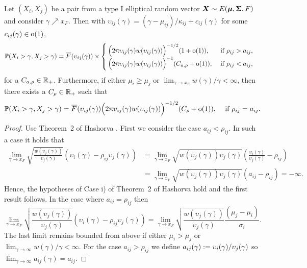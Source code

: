 \begin{subappendices}
\begin{theorem} \label{thm:type_1_asymptotics}
 Let $(X_i, X_j)$ be a pair from a type I elliptical random vector $\bm{X} \sim E(\bm{\mu}, \bm{\Sigma}, F)$
 and consider $\gamma \nearrow x_F$.
Then with $\upsilon_{ij}(\gamma)=(\gamma-\mu_{ij})/\kappa_{ij}+c_{ij}(\gamma)$ for some $c_{ij}(\gamma) \in {\mathrm{o}}(1)$,
 \begin{align*}
   \Prob(X_i > \gamma, X_j > \gamma)
   &= \Ftail(\upsilon_{ij}(\gamma)) \times \begin{cases}
   		 \Bigl( 2\pi \upsilon_{ij}(\gamma) w(\upsilon_{ij}(\gamma)) \Bigr)^{-1/2}(1 + \oh(1)),
   		 & \text{ if } \rho_{ij} > a_{ij}, \\
         \Bigl( 2\pi \upsilon_{ij}(\gamma) w(\upsilon_{ij}(\gamma)) \Bigr)^{-1}(C_{a,\rho} + \oh(1)),
         & \text{ if } \rho_{ij} < a_{ij},
   	\end{cases}
 \end{align*}
 for a $C_{a,\rho} \in \mathbb{R}_+$.
Furthermore, if either $\mu_i\ge\mu_j$ or $\lim_{\gamma\to x_F}w(\gamma)/\gamma<\infty$, then there exists a $C_\rho \in \mathbb{R}_+$ such that
 \begin{align*}
   \Prob(X_i > \gamma, X_j > \gamma)
   &= \Ftail(\upsilon_{ij}(\gamma)) \Bigl( 2\pi \upsilon_{ij}(\gamma) w(\upsilon_{ij}(\gamma)) \Bigr)^{-1/2}(C_\rho + \oh(1)),
   		 & \text{ if } \rho_{ij} = a_{ij}.
 \end{align*}
\end{theorem}

\begin{proof}

Use Theorem~2 of Hashorva \cite{hashorva2007asymptotic}.
First we consider the case $a_{ij}<\rho_{ij}$.  In such a case it holds that
\begin{align*}
 \lim_{\gamma\to x_F} \sqrt{\frac{w(\upsilon_j(\gamma))}{\upsilon_j(\gamma)}}\left(\upsilon_i(\gamma)-\rho_{ij}\upsilon_j(\gamma)\right)
 &=\lim_{\gamma\to x_F} \sqrt{{w(\upsilon_j(\gamma))\upsilon_j(\gamma)}}\left(\frac{\upsilon_i(\gamma)}{\upsilon_j(\gamma)}-\rho_{ij}\right)\\
 &=\lim_{\gamma\to x_F} \sqrt{{w(\upsilon_j(\gamma))\upsilon_j(\gamma)}}\left(a_{ij}-\rho_{ij}\right)=-\infty.
\end{align*}
Hence, the hypotheses of Case i) of Theorem~2 of Hashorva \cite{hashorva2007asymptotic} hold and the first result follows.
In the case where $a_{ij}=\rho_{ij}$ then
\[
 \lim_{\gamma\to x_F} \sqrt{\frac{w(\upsilon_j(\gamma))}{\upsilon_j(\gamma)}}\left(\upsilon_i(\gamma)-\rho_{ij}\upsilon_j(\gamma)\right)
 =\lim_{\gamma\to x_F} \sqrt{\frac{w(\upsilon_j(\gamma))}{\upsilon_j(\gamma)}}\frac{(\mu_j-\mu_{i})}{\sigma_i}.
\]
The last limit remains bounded from above if either $\mu_i>\mu_j$ or $\lim_{\gamma\to\infty}w(\gamma)/\gamma<\infty$.
For the case $a_{ij}>\rho_{ij}$ we define
$a_{ij}(\gamma) := \upsilon_i(\gamma) / \upsilon_j(\gamma)$ so $\lim_{\gamma \to \infty} a_{ij}(\gamma)=a_{ij}$.


\end{proof}
\end{subappendices}
